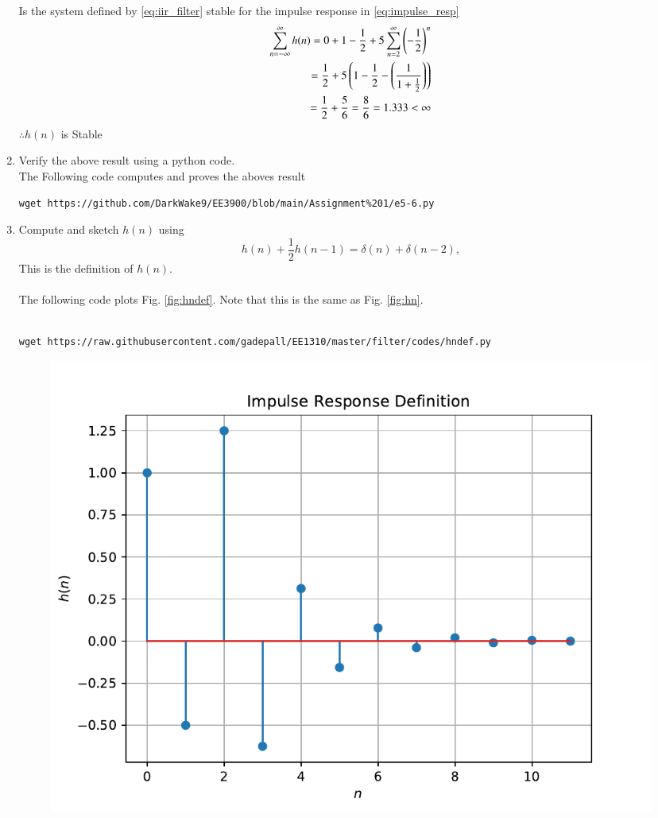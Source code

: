 \documentclass[journal,12pt,twocolumn]{IEEEtran}
\renewcommand\thesection{\arabic{section}}
\begin{document}
\begin{enumerate}[label=\thesection.\arabic*]
\begin{equation}
		\end{equation}
		Is the system defined by \eqref{eq:iir_filter} stable for the impulse response in \eqref{eq:impulse_resp}\\
		\solution
		\begin{align}
			\sum_{n=-\infty}^{\infty}h(n) = 0 + 1 - \frac{1}{2} + 5\sum_{n=2}^{\infty} \left(-\dfrac{1}{2}\right)^{n}\\
			= \dfrac{1}{2} + 5\left(1 - \dfrac{1}{2} - \left(\dfrac{1}{1 + \tfrac{1}{2}}\right)\right)\\
			= \dfrac{1}{2} + \dfrac{5}{6} = \dfrac{8}{6} = 1.333 < \infty
		\end{align}
			$\therefore h(n)$  is Stable\\
		\item Verify the above result using a python code.\\
		\solution The Following code computes and proves the aboves result
		\begin{lstlisting}
wget https://github.com/DarkWake9/EE3900/blob/main/Assignment%201/e5-6.py
		\end{lstlisting}
		\item 
		Compute and sketch $h(n)$ using 
		\begin{equation}
			\label{eq:iir_filter_h}
			h(n) + \frac{1}{2}h(n-1) = \delta(n) + \delta(n-2), 
		\end{equation}
		This is the definition of $h(n)$.
		\\\\
		\solution The following code plots Fig. \ref{fig:hndef}. Note that this is the same as Fig. \ref{fig:hn}. \\\\
		\begin{lstlisting}
wget https://raw.githubusercontent.com/gadepall/EE1310/master/filter/codes/hndef.py
		\end{lstlisting}
		\begin{figure}[!ht]
			\centering
			\includegraphics[width=\columnwidth]{./figs/hndef}

\end{figure}
\end{enumerate}
\end{document}
